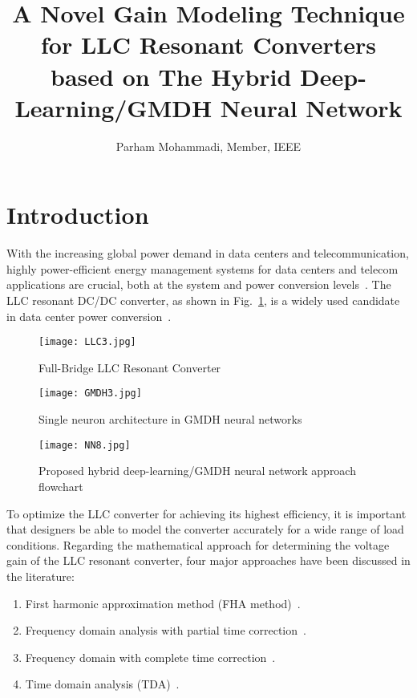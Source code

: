 \documentclass{article} %
\title{\textbf{A Novel Gain Modeling Technique for LLC Resonant Converters 
based on The Hybrid Deep-Learning/GMDH Neural Network}}
\author[1]{Parham Mohammadi, Member, IEEE}
\affil[1]{Electrical Engineering and Computer Science Department, York University, Toronto, Ontario}
\date{} %
\begin{document}
\maketitle

\section{Introduction}
With the increasing global power demand in data centers and telecommunication, highly power-efficient energy management systems for data centers and telecom applications are crucial, both at the system and power conversion levels~\cite{YangChenQueensUniversity2017,Ahmed2020,Lu2020,Chen2018,Mu2016,Hayashi2015,Rizzolatti2019}.
The LLC resonant DC/DC converter, as shown in Fig.~\ref{fig:LLC}, is a widely used candidate in data center power conversion~\cite{YangChenQueensUniversity2017,Ahmed2020,Lu2020,Chen2018,Mu2016,Hayashi2015,Rizzolatti2019}. 

\begin{figure}[ht]
\centering
\texttt{[image: LLC3.jpg]}
\caption{Full-Bridge LLC Resonant Converter}
\label{fig:LLC}
\end{figure}

\begin{figure}[t]
\centering
\texttt{[image: GMDH3.jpg]}
\caption{Single neuron architecture in GMDH neural networks}
\label{fig:GMDH}
\end{figure}

\begin{figure*}[ht]
\centering
\texttt{[image: NN8.jpg]}
\caption{Proposed hybrid deep-learning/GMDH neural network approach flowchart}
\label{fig:flowchart}
\end{figure*}

\par To optimize the LLC converter for achieving its highest efficiency, it is important that designers be able to model the converter accurately for a wide range of load conditions. Regarding the mathematical approach for determining the voltage gain of the LLC resonant converter, four major approaches have been discussed in the literature:
\vspace{0.25cm}
\begin{enumerate}
\item First harmonic approximation method (FHA method)~\cite{Steigerwald1988}.
\item Frequency domain analysis with partial time correction~\cite{Ivensky2011}.
\item Frequency domain with complete time correction~\cite{Liu2016}.
\item Time domain analysis (TDA)~\cite{Menke2020,Shen2020,Shafiei2017,Applications2020,Kumar2019,Glitz2019,Hong2010,Fang2011,Deng2014,Hu2015,Wei2019a}.
\end{enumerate}
\vspace{0.25cm}
\end{document}
